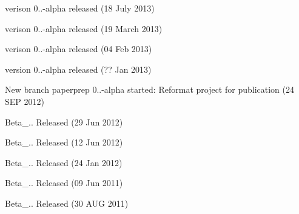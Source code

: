 
\begin{DoxyItemize}
\item verison 0..-\/alpha  released (18 July 2013)
\item verison 0..-\/alpha  released (19 March 2013)
\item verison 0..-\/alpha  released (04 Feb 2013)
\item version 0..-\/alpha released (?? Jan 2013)
\item New branch paperprep 0..-\/alpha started\+: Reformat project for publication (24 S\+E\+P 2012)
\item Beta\+\_.. Released (29 Jun 2012)
\item Beta\+\_.. Released (12 Jun 2012)
\item Beta\+\_.. Released (24 Jan 2012)
\item Beta\+\_.. Released (09 Jun 2011)
\item Beta\+\_.. Released (30 A\+U\+G 2011) 
\end{DoxyItemize}